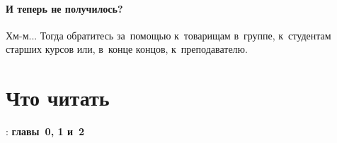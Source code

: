 \paragraph{И теперь не получилось?}
Хм-м... Тогда обратитесь за~помощью к~товарищам в~группе, к~студентам старших курсов или, в~конце концов, к~преподавателю.



\section{Что читать}
\textcite{Stroustrup:2016:ru}: \textbf{главы~0, 1 и~2}
